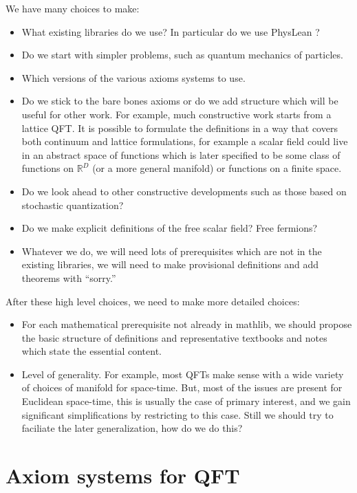 \documentclass{article}
\newcommand{\1}{\mathbbm{1}}
\theoremstyle{plain}
\theoremstyle{definition}
\numberwithin{equation}{section}
\def\IR{\mathbb{R}}
\begin{document}
We have many choices to make:
\begin{itemize}
    \item What existing libraries do we use?  In particular do we use PhysLean ?
    \item Do we start with simpler problems, such as quantum mechanics of particles.
    \item Which versions of the various axioms systems to use.
    \item Do we stick to the bare bones axioms or do we add structure which will be useful for other work.
    For example, much constructive work starts from a lattice QFT.  It is possible to formulate the definitions
    in a way that covers both continuum and lattice formulations, for example a scalar field could live in an
    abstract space of functions which is later specified to be some class of functions on $\IR^D$ (or a more
    general manifold) or functions on a finite space.
    \item Do we look ahead to other constructive developments such as those based on stochastic quantization?
    \item Do we make explicit definitions of the free scalar field?  Free fermions?
    \item Whatever we do, we will need lots of prerequisites which are not in the existing libraries, we will need to make
    provisional definitions and add theorems with ``sorry.''
\end{itemize}

After these high level choices, we need to make more detailed choices:
\begin{itemize}
    \item For each mathematical prerequisite not already in mathlib, we should propose the basic structure of
    definitions and representative textbooks and notes which state the essential content.
    \item Level of generality.  For example, most QFTs make sense with a wide variety of choices of manifold for space-time.
    But, most of the issues are present for Euclidean space-time, this is usually the case of primary interest,
    and we gain significant simplifications by restricting to this case.
    Still we should try to faciliate the later generalization, how do we do this?
\end{itemize}

\section{Axiom systems for QFT}
\end{document}
